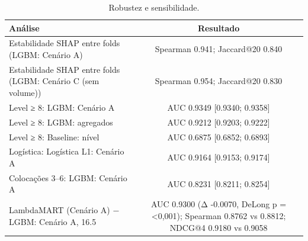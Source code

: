 \begin{table}[htbp]
\caption{Robustez e sensibilidade.}
\label{tab:robustez}
\centering
\small
\begin{tabular}{lc}
\toprule
Análise & Resultado \\
\midrule
Estabilidade SHAP entre folds (LGBM: Cenário A) & Spearman 0.941; Jaccard@20 0.840 \\
Estabilidade SHAP entre folds (LGBM: Cenário C (sem volume)) & Spearman 0.954; Jaccard@20 0.830 \\
Level ≥ 8: LGBM: Cenário A & AUC 0.9349 [0.9340; 0.9358] \\
Level ≥ 8: LGBM: agregados & AUC 0.9212 [0.9203; 0.9222] \\
Level ≥ 8: Baseline: nível & AUC 0.6875 [0.6852; 0.6893] \\
Logística: Logística L1: Cenário A & AUC 0.9164 [0.9153; 0.9174] \\
Colocações 3–6: LGBM: Cenário A & AUC 0.8231 [0.8211; 0.8254] \\
LambdaMART (Cenário A) − LGBM: Cenário A, 16.5 & AUC 0.9300 (Δ -0.0070, DeLong p = <0,001); Spearman 0.8762 vs 0.8812; NDCG@4 0.9180 vs 0.9058 \\
\bottomrule
\end{tabular}
\end{table}
